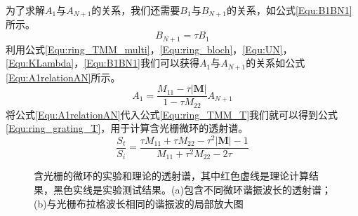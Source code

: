 为了求解$A_1$与$A_{N+1}$的关系，我们还需要$B_{1}$与$B_{N+1}$的关系，如公式\ref{Equ:B1BN1}所示。
\begin{equation}
\label{Equ:B1BN1}
B_{N+1} = \tau B_1 
\end{equation}
利用公式\ref{Equ:ring_TMM_multi}，\ref{Equ:ring_bloch}，\ref{Equ:UN}，\ref{Equ:KLambda}，\ref{Equ:B1BN1}我们可以获得$A_1$与$A_{N+1}$的关系如公式\ref{Equ:A1relationAN}所示。
\begin{equation}
\label{Equ:A1relationAN}
A_1 = \frac{M_{11}-\tau |\textbf{M}|}{1-\tau M_{22}}A_{N+1}
\end{equation}
将公式\ref{Equ:A1relationAN}代入公式\ref{Equ:ring_TMM_T}我们就可以得到公式\ref{Equ:ring_grating_T}，用于计算含光栅微环的透射谱。
\begin{equation}
\label{Equ:ring_grating_T}
\frac{S_t}{S_i}=\frac{\tau M_{11} + \tau M_{22} - \tau^2|\textbf{M}|-1}{M_{11}+\tau^2 M_{22}-2\tau}
\end{equation}
\begin{figure}[htb]
	\small
	\caption{含光栅的微环的实验和理论的透射谱，其中红色虚线是理论计算结果，黑色实线是实验测试结果。(a)包含不同微环谐振波长的透射谱；(b)与光栅布拉格波长相同的谐振波的局部放大图}
	\label{chapt5_grating_ring_single}	
\end{figure}

